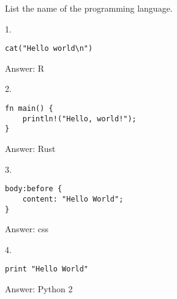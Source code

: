 \documentclass{article}
\begin{document}
\begin{center}
    List the name of the programming language.
\end{center}


\begin{multicols}{2}

1.
\begin{verbatim}
cat("Hello world\n")
\end{verbatim}

\columnbreak

\begin{flushright}
    Answer: R
\end{flushright}

\end{multicols}


\hrulefill
\begin{multicols}{2}

2.
\begin{verbatim}
fn main() {
    println!("Hello, world!");
}
\end{verbatim}

\columnbreak

\begin{flushright}
    Answer: Rust
\end{flushright}

\end{multicols}

\hrulefill
\begin{multicols}{2}


3.
\begin{verbatim}
body:before {
    content: "Hello World";
}
\end{verbatim}

\columnbreak

\begin{flushright}
    Answer: css
\end{flushright}

\end{multicols}

\hrulefill
\begin{multicols}{2}

4.
\begin{verbatim}
print "Hello World"
\end{verbatim}

\columnbreak

\begin{flushright}
    Answer: Python 2
\end{flushright}

\end{multicols}
\end{document}
